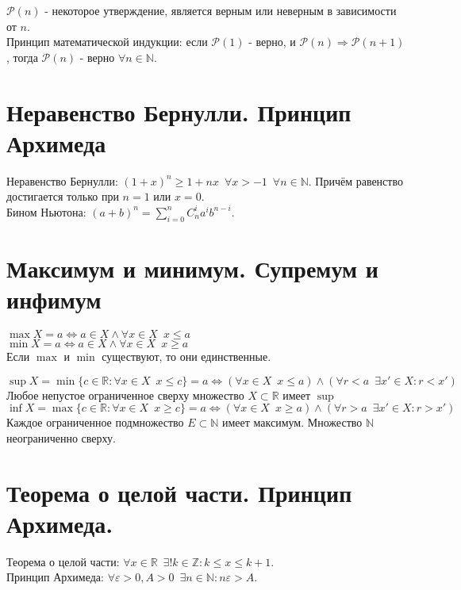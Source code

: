 \documentclass[11pt, a4paper]{article}
\def\R{\mathbb{R}}
\def\Z{\mathbb{Z}}
\def\N{\mathbb{N}}
\def\sp{\, \, \,}
\begin{document}
    $\mathcal{P}(n)$ - некоторое утверждение, является верным или неверным в зависимости от $n$.\\
    Принцип математической индукции: если $\mathcal{P}(1)$ - верно, и $\mathcal{P}(n) \Rightarrow \mathcal{P}(n+1)$, тогда $\mathcal{P}(n)$ - верно $\forall n \in \N$.

    \section{Неравенство Бернулли. Принцип Архимеда}
    Неравенство Бернулли: $(1+x)^n \geq 1+nx \sp \forall x > -1 \sp \forall n \in \N$. Причём равенство достигается только при $n = 1$ или $x = 0$.\\
    Бином Ньютона: $\displaystyle (a+b)^n = \sum_{i=0}^n C_n^i a^i b^{n-i}$.

    \section{Максимум и минимум. Супремум и инфимум}
    $\max X = a \Leftrightarrow a \in X \land \forall x \in X \sp x \leq a$\\
    $\min X = a \Leftrightarrow a \in X \land \forall x \in X \sp x \geq a$\\
    Если $\max$ и $\min$ существуют, то они единственные.

    $\sup X = \min \{c \in \R: \forall x \in X \sp x \leq c\} = a \Leftrightarrow (\forall x \in X \sp x \leq a) \land (\forall r < a \sp \exists x' \in X: r < x')$\\
    Любое непустое ограниченное сверху множество $X \subset \R$ имеет $\sup$\\
    $\inf X = \max \{c \in \R: \forall x \in X \sp x \geq c\} = a \Leftrightarrow (\forall x \in X \sp x \geq a) \land (\forall r > a \sp \exists x' \in X: r > x')$\\

    Каждое ограниченное подмножество $E \subset \N$ имеет максимум. Множество $\N$ неограниченно сверху.

    \section{Теорема о целой части. Принцип Архимеда.}
    Теорема о целой части: $\forall x \in \R \sp \exists ! k \in \Z: k \leq x \leq k+1$.\\
    Принцип Архимеда: $\forall \varepsilon > 0 , A > 0 \sp \exists n \in \N : n\varepsilon > A$.
\end{document}
